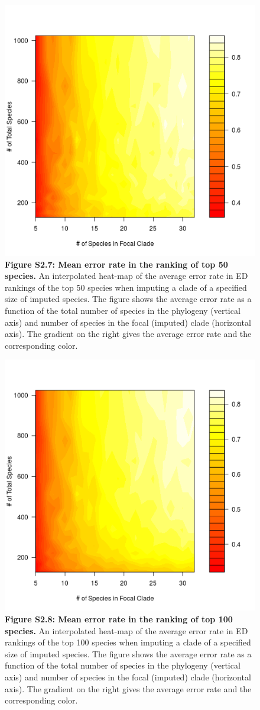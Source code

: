\documentclass[10pt,english]{article}
\begin{document}
\begin{figure}[!ht]
  \center
  \includegraphics[width=.5\textwidth]{../figures/errorRate50.png}
  \caption*{\textbf{Figure S2.7: Mean error rate in the ranking of top 50
  species.} An interpolated heat-map of the average error rate in ED rankings of
  the top 50 species when imputing a clade of a specified size of imputed
  species. The figure shows the average error rate as a function of the total
  number of species in the phylogeny (vertical axis) and number of species in
  the focal (imputed) clade (horizontal axis). The gradient on the right gives
  the average error rate and the corresponding color.}
\end{figure}

\begin{figure}[!ht]
  \center
  \includegraphics[width=.5\textwidth]{../figures/errorRate100.png}
  \caption*{\textbf{Figure S2.8: Mean error rate in the ranking of top 100
  species.} An interpolated heat-map of the average error rate in ED rankings of
  the top 100 species when imputing a clade of a specified size of imputed
  species. The figure shows the average error rate as a function of the total
  number of species in the phylogeny (vertical axis) and number of species in
  the focal (imputed) clade (horizontal axis). The gradient on
  the right gives the average error rate and the corresponding color.}
\end{figure}
\end{document}
